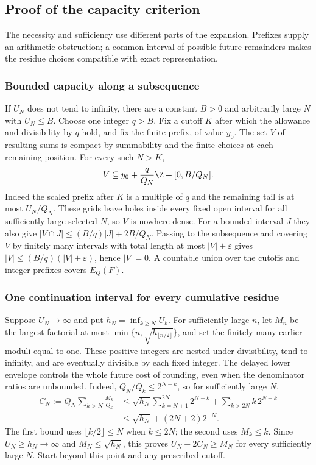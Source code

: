 \documentclass[11pt]{article}
\begin{document}
\subsection{Proof of the capacity criterion}\label{capacity:sec:capacity-proof}
The necessity and sufficiency use different parts of the expansion. Prefixes
supply an arithmetic obstruction; a common interval of possible future
remainders makes the residue choices compatible with exact representation.

\subsubsection{Bounded capacity along a subsequence}
If $U_N$ does not tend to infinity, there are a constant $B>0$ and arbitrarily
large $N$ with $U_N\le B$. Choose one integer $q>B$. Fix a cutoff $K$ after
which the allowance and divisibility by $q$ hold, and fix the finite prefix,
of value $y_0$. The set $V$ of resulting sums is compact by summability and
the finite choices at each remaining position. For every such $N>K$,
\[
 V\subseteq y_0+\frac q{Q_N}\Z+[0,B/Q_N].
\]
Indeed the scaled prefix after $K$ is a multiple of $q$ and the remaining
tail is at most $U_N/Q_N$. These grids leave holes inside every fixed open
interval for all sufficiently large selected $N$, so $V$ is nowhere dense.
For a bounded interval $J$ they also give
$|V\cap J|\le(B/q)|J|+2B/Q_N$.
Passing to the subsequence and covering $V$ by finitely many intervals with
total length at most $|V|+\varepsilon$ gives
$|V|\le(B/q)(|V|+\varepsilon)$, hence $|V|=0$.
A countable union over the cutoffs and integer prefixes covers $E_Q(F)$.

\subsubsection{One continuation interval for every cumulative residue}
Suppose $U_N\to\infty$ and put $h_N=\inf_{k\ge N}U_k$. For sufficiently
large $n$, let $M_n$ be the largest factorial at most
$\min\{n,\sqrt{h_{\lfloor n/2\rfloor}}\}$, and set the finitely many
earlier moduli equal to one. These positive integers are nested under
divisibility, tend to infinity, and are eventually divisible by each fixed
integer. The delayed lower envelope controls the whole future cost of
rounding, even when the denominator ratios are unbounded. Indeed,
$Q_N/Q_k\le2^{N-k}$, so for sufficiently large $N$,
\[
 \begin{aligned}
 C_N:=Q_N\sum_{k>N}\frac{M_k}{Q_k}
 &\le\sqrt{h_N}\sum_{k=N+1}^{2N}2^{N-k}
       +\sum_{k>2N}k\,2^{N-k}\\
 &\le\sqrt{h_N}+(2N+2)2^{-N}.
 \end{aligned}
\]
The first bound uses $\lfloor k/2\rfloor\le N$ when $k\le2N$; the second
uses $M_k\le k$. Since $U_N\ge h_N\to\infty$ and
$M_N\le\sqrt{h_N}$, this proves $U_N-2C_N\ge M_N$ for every sufficiently
large $N$. Start beyond this point and any prescribed cutoff.
\end{document}
